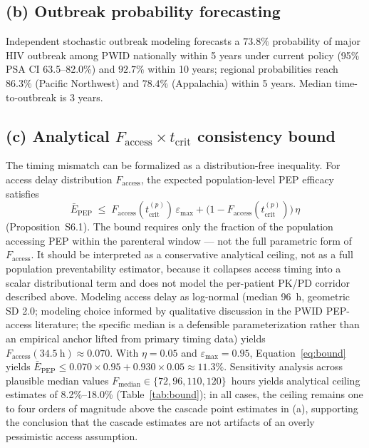 \documentclass[10pt,letterpaper]{article}
\theoremstyle{definition}
\theoremstyle{remark}
\newcommand{\Ebarpep}{\bar{E}_{\text{PEP}}}
\newcommand{\Faccess}{F_{\text{access}}}
\newcommand{\tcrit}{t_{\text{crit}}}
\newcommand{\emax}{\varepsilon_{\max}}
\begin{document}
\subsection*{(b) Outbreak probability forecasting}

Independent stochastic outbreak modeling\cite{demidont_companion} forecasts a $73.8\%$ probability of major HIV outbreak among PWID nationally within 5 years under current policy (95\% PSA CI 63.5--82.0\%) and $92.7\%$ within 10 years; regional probabilities reach $86.3\%$ (Pacific Northwest) and $78.4\%$ (Appalachia) within 5 years. Median time-to-outbreak is 3 years.

\subsection*{(c) Analytical $\Faccess \times \tcrit$ consistency bound}
The timing mismatch can be formalized as a distribution-free inequality. For access delay distribution $\Faccess$, the expected population-level PEP efficacy satisfies
\begin{equation}
\Ebarpep \;\leq\; \Faccess(\tcrit^{(p)})\,\emax + \big(1 - \Faccess(\tcrit^{(p)})\big)\,\eta
\label{eq:bound}
\end{equation}
(Proposition~S6.1). The bound requires only the fraction of the population accessing PEP within the parenteral window --- not the full parametric form of $\Faccess$. It should be interpreted as a conservative analytical ceiling, not as a full population preventability estimator, because it collapses access timing into a scalar distributional term and does not model the per-patient PK/PD corridor described above. Modeling access delay as log-normal (median 96~h, geometric SD 2.0; modeling choice informed by qualitative discussion in the PWID PEP-access literature\cite{taylor2019,baugher2025}; the specific median is a defensible parameterization rather than an empirical anchor lifted from primary timing data) yields $\Faccess(34.5~\text{h}) \approx 0.070$. With $\eta = 0.05$ and $\emax = 0.95$, Equation~\ref{eq:bound} yields $\Ebarpep \leq 0.070 \times 0.95 + 0.930 \times 0.05 \approx 11.3\%$. Sensitivity analysis across plausible median values $F_{\text{median}} \in \{72, 96, 110, 120\}$~hours yields analytical ceiling estimates of 8.2\%--18.0\% (Table~\ref{tab:bound}); in all cases, the ceiling remains one to four orders of magnitude above the cascade point estimates in (a), supporting the conclusion that the cascade estimates are not artifacts of an overly pessimistic access assumption.
\end{document}
